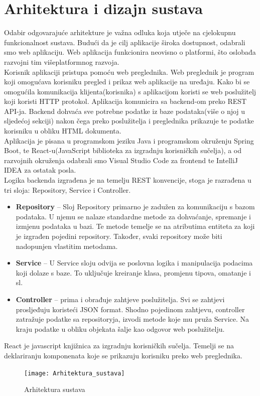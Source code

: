 \chapter{Arhitektura i dizajn sustava}
			
			
			Odabir odgovarajuće arhitekture je važna odluka koja utječe na cjelokupnu funkcionalnost sustava. Budući da je cilj aplikacije široka dostupnost, odabrali smo web aplikaciju. Web aplikacija funkcionira neovisno o platformi, što oslobađa razvojni tim višeplatformnog razvoja.\\
			Korisnik aplikaciji pristupa pomoću web preglednika. Web preglednik je program koji omogućava korisniku pregled i prikaz web aplikacije na uređaju. Kako bi se omogućila komunikacija klijenta(korisnika) s aplikacijom koristi se web poslužitelj koji koristi HTTP protokol. Aplikacija komunicira sa backend-om preko REST API-ja. Backend dohvaća sve potrebne podatke iz baze podataka(više o njoj u sljedećoj sekciji) nakon čega preko poslužitelja i preglednika prikazuje te podatke korisniku u obliku HTML dokumenta.\\
			Aplikacija je pisana u programskom jeziku Java i programskom okruženju Spring Boot, te React-u(JavaScript biblioteka za izgradnju korisničkih sučelja), a od razvojnih okruženja odabrali smo Visual Studio Code za frontend  te IntelliJ IDEA za ostatak posla.\\
			
Logika backenda izgrađena je na temelju REST konvencije, stoga je razrađena u tri sloja: Repository, Service i Controller. 
			\begin{itemize}
				\item \textbf{Repository} – Sloj Repository primarno je zadužen za komunikaciju s bazom podataka. U njemu se nalaze standardne metode za dohvaćanje, spremanje i izmjenu podataka u bazi. Te metode temelje se na atributima entiteta za koji je izgrađen pojedini repository. Također, svaki repository može biti nadopunjen vlastitim metodama.
				\item \textbf{Service} – U Service sloju odvija se poslovna logika i manipulacija podacima koji dolaze s baze. To uključuje kreiranje klasa, promjenu tipova, omatanje i sl. 
				\item \textbf{Controller} –  prima i obrađuje zahtjeve poslužitelja. Svi se zahtjevi prosljeđuju koristeći JSON format. Shodno pojedinom zahtjevu, controller zatražuje podatke sa repositoryja, izvodi metode koje mu pruža Service. Na kraju podatke u obliku objekata šalje kao odgovor web poslužitelju.  
			\end{itemize}
			React je javascript knjižnica za izgradnju korisničkih sučelja. Temelji se na deklariranju komponenata koje se prikazuju korisniku preko web preglednika.
			\begin{figure}
				\texttt{[image: Arhitektura\_sustava]}
				\caption{Arhitektura sustava}
			\end{figure}
			
